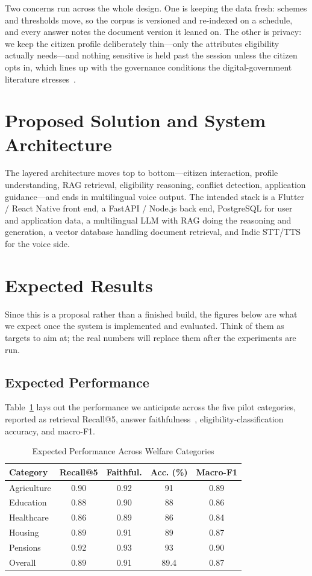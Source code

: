 \documentclass[conference]{IEEEtran}
\begin{document}
Two concerns run across the whole design. One is keeping the data fresh: schemes and thresholds move, so the corpus is versioned and re-indexed on a schedule, and every answer notes the document version it leaned on. The other is privacy: we keep the citizen profile deliberately thin---only the attributes eligibility actually needs---and nothing sensitive is held past the session unless the citizen opts in, which lines up with the governance conditions the digital-government literature stresses~\cite{zhang2026llm}.

\section{Proposed Solution and System Architecture}
\label{sec:arch}
The layered architecture moves top to bottom---citizen interaction, profile understanding, RAG retrieval, eligibility reasoning, conflict detection, application guidance---and ends in multilingual voice output. The intended stack is a Flutter / React Native front end, a FastAPI / Node.js back end, PostgreSQL for user and application data, a multilingual LLM with RAG doing the reasoning and generation, a vector database handling document retrieval, and Indic STT/TTS for the voice side.

\section{Expected Results}
\label{sec:results}
Since this is a proposal rather than a finished build, the figures below are what we expect once the system is implemented and evaluated. Think of them as targets to aim at; the real numbers will replace them after the experiments are run.

\subsection{Expected Performance}
Table~\ref{tab:perf} lays out the performance we anticipate across the five pilot categories, reported as retrieval Recall@5, answer faithfulness~\cite{filice2025awf,es2024ragas}, eligibility-classification accuracy, and macro-F1.

\begin{table}[htbp]
\caption{Expected Performance Across Welfare Categories}
\label{tab:perf}
\centering
\begin{tabular}{lcccc}
\toprule
\textbf{Category} & \textbf{Recall@5} & \textbf{Faithful.} & \textbf{Acc. (\%)} & \textbf{Macro-F1} \\
\midrule
Agriculture & 0.90 & 0.92 & 91 & 0.89 \\
Education & 0.88 & 0.90 & 88 & 0.86 \\
Healthcare & 0.86 & 0.89 & 86 & 0.84 \\
Housing & 0.89 & 0.91 & 89 & 0.87 \\
Pensions & 0.92 & 0.93 & 93 & 0.90 \\
\midrule
Overall & 0.89 & 0.91 & 89.4 & 0.87 \\
\bottomrule
\end{tabular}
\end{table}
\end{document}
